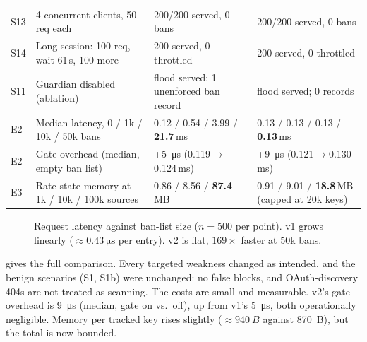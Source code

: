 \documentclass[10pt,twocolumn]{article}
\begin{document}
\begin{table}[t]
\begin{tabularx}{\textwidth}{@{}l X X X@{}}
S13 & 4 concurrent clients, 50 req each & 200/200 served, 0 bans & 200/200 served, 0 bans \\
S14 & Long session: 100 req, wait 61\,s, 100 more & 200 served, 0 throttled & 200 served, 0 throttled \\
S11 & Guardian disabled (ablation) & flood served; 1 unenforced ban record & flood served; 0 records \\
\midrule
E2 & Median latency, 0 / 1k / 10k / 50k bans & 0.12 / 0.54 / 3.99 / \textbf{21.7}\,ms & 0.13 / 0.13 / 0.13 / \textbf{0.13}\,ms \\
E2 & Gate overhead (median, empty ban list) & +\SI{5}{\micro\second} (0.119$\to$0.124\,ms) & +\SI{9}{\micro\second} (0.121$\to$0.130\,ms) \\
E3 & Rate-state memory at 1k / 10k / 100k sources & 0.86 / 8.56 / \textbf{87.4}\,MB & 0.91 / 9.01 / \textbf{18.8}\,MB (capped at 20k keys) \\
\bottomrule
\end{tabularx}
\end{table}

\begin{figure}[t]
\centering
{}
\caption{Request latency against ban-list size ($n{=}500$ per point). v1
grows linearly (${\approx}\SI{0.43}{\micro\second}$ per entry). v2 is flat,
$169\times$ faster at 50k bans.}
\label{fig:bans}
\end{figure}

  gives the full comparison. Every
targeted weakness changed as intended, and the benign scenarios (S1, S1b) were
unchanged: no false blocks, and OAuth-discovery 404s are not treated as
scanning. The costs are small and measurable. v2's gate overhead is
\SI{9}{\micro\second} (median, gate on vs.\ off), up from v1's
\SI{5}{\micro\second}, both operationally negligible. Memory per tracked key rises slightly (${\approx}\SI{940}{B}$
against \SI{870}{B}), but the total is now bounded.
\end{document}
